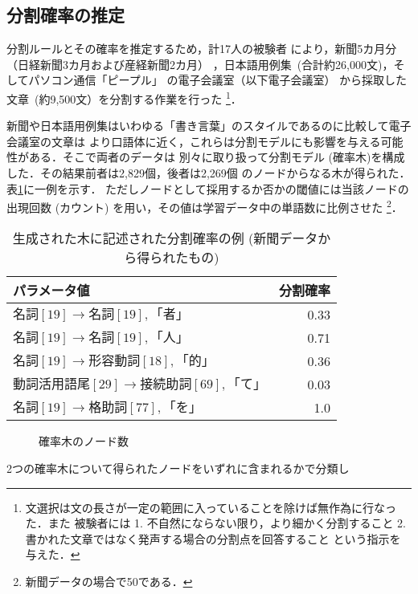 \subsection{分割確率の推定}
  分割ルールとその確率を推定するため，計17人の被験者
\mbox{により，新聞5カ月分（日経新聞3}カ月および産経新聞2カ月）
\mbox{，日本語用例集 (合計約26,000文)，そしてパソコン通信「ピープ}ル」
の電子会議室（以下電子会議室）
\mbox{から採取した文章 (約9,500文）を分割する作業を行った}
\footnote{
文選択は文の長さが一定の範囲に入っていることを除けば無作為に行なった．また
被験者には
1. 不自然にならない限り，より細かく分割すること
2. 書かれた文章ではなく発声する場合の分割点を回答すること
という指示を与えた．}．
\par
新聞や日本語用例集はいわゆる「書き言葉」のスタイルであるのに比較して電子会議室の文章は
より口語体に近く，これらは分割モデルにも影響を与える可能性がある．そこで両者のデータは
別々に取り扱って分割モデル (確率木)を構成した．その結果前者は2,829個，後者は2,269個
のノードからなる木が得られた．表\ref{TBL:RULES}に一例を示す．
ただしノードとして採用するか否かの閾値には当該ノードの出現回数 (カウント)
を用い，その値は学習データ中の単語数に比例させた \footnote{新聞データの場合で50である．}．
\begin{table}[t]
\begin{center}
\caption{生成された木に記述された分割確率の例 (新聞データから得られたもの)}
\label{TBL:RULES}
\begin{tabular}{lr} \hline
  パラメータ値                              & 分割確率 \\ \hline
  $名詞[19]\rightarrow 名詞[19],「者」$ & 0.33 \\
  $名詞[19]\rightarrow 名詞[19],「人」$ & 0.71 \\
  $名詞[19]\rightarrow 形容動詞[18],「的」$ &  0.36 \\
  $動詞活用語尾[29]\rightarrow 接続助詞[69],「て」$ & 0.03 \\
  $名詞[19]\rightarrow 格助詞[77],「を」$ & 1.0 \\ \hline
\end{tabular}
\end{center}
\end{table}
\begin{figure}[t]
\begin{center}
\vspace{6mm}
  \caption{確率木のノード数}
  \label{FIG:CMPSTAT}
\end{center}
\end{figure}
  2つの確率木について得られたノードをいずれに含まれるかで分類し
